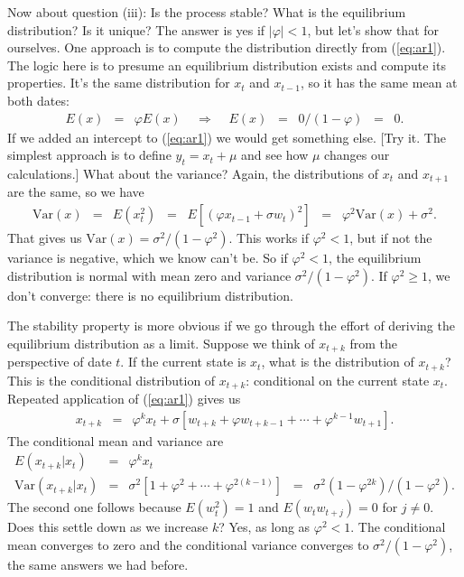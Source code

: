 \documentclass[11pt]{article}
\begin{document}
Now about question (iii):  Is the process stable?
What is the equilibrium distribution?
Is it unique?
The answer is yes if $|\varphi| < 1$, but let's show that for ourselves.
One approach is to compute the distribution directly
from (\ref{eq:ar1}).
The logic here is to presume an equilibrium distribution exists and
compute its properties.
It's the same distribution for $x_t$ and $x_{t-1}$,
so it has the same mean at both dates:
\begin{eqnarray*}
    E( x ) &=& \varphi E(x) \;\;\;\;\Rightarrow\;\;\;\; E(x)
        \;\;=\;\; 0/(1-\varphi) \;\;=\;\; 0 .
\end{eqnarray*}
If we added an intercept to (\ref{eq:ar1}) we would get something else.
[Try it. The simplest approach is to define $y_t = x_t + \mu$
and see how $\mu$ changes our calculations.]
What about the variance?
Again, the distributions of $x_t$ and $x_{t+1}$ are the same,
so we have
\begin{eqnarray*}
    \mbox{Var}(x) &=& E (x_{t}^2)
            \;\;=\;\; E \left[ (\varphi x_{t-1} + \sigma w_{t})^2 \right]
            \;\;=\;\; \varphi^2 \mbox{Var}(x) + \sigma^2.
\end{eqnarray*}
That gives us $\mbox{Var}(x) = \sigma^2 /(1-\varphi^2)$.
This works if $\varphi^2 < 1$,
but if not the variance is negative, which
we know can't be.  So if $ \varphi^2<1$, the
equilibrium distribution is normal with mean zero
and variance $ \sigma^2/(1-\varphi^2)$.
If $\varphi^2 \geq 1$, we don't converge:  there is no equilibrium distribution.

The stability property is more obvious if we go through the effort
of deriving the equilibrium distribution as a limit.
Suppose we think of $x_{t+k}$ from the perspective of date $t$.
If the current state is $x_{t}$, what is the distribution of $x_{t+k}$?
This is the conditional distribution of $x_{t+k}$:  conditional
on the current state $x_t$.
Repeated application of (\ref{eq:ar1}) gives us
\begin{eqnarray*}
    x_{t+k} &=& \varphi^k x_{t} +
            \sigma \left[ w_{t+k} + \varphi w_{t+k-1} +
                    \cdots + \varphi^{k-1} w_{t+1} \right].
\end{eqnarray*}
The conditional mean and variance are
\begin{eqnarray*}
    E (x_{t+k} | x_t ) &=& \varphi^k x_{t} \\
    \mbox{Var}(x_{t+k} | x_t )
            &=&  \sigma^2 \left[ 1 + \varphi^2 + \cdots + \varphi^{2(k-1)} \right]
                \;\;=\;\; \sigma ^2 (1-\varphi^{2k})/(1-\varphi^2) .
\end{eqnarray*}
The second one follows because $E(w_t^2) = 1$
and $E (w_t w_{t+j}) = 0$ for $ j\neq 0$.
Does this settle down as we increase $k$?
Yes, as long as $\varphi^2 < 1$.
The conditional mean converges to zero and
the conditional variance converges to $\sigma^2/(1-\varphi^2)$,
the same answers we had before.
\end{document}
